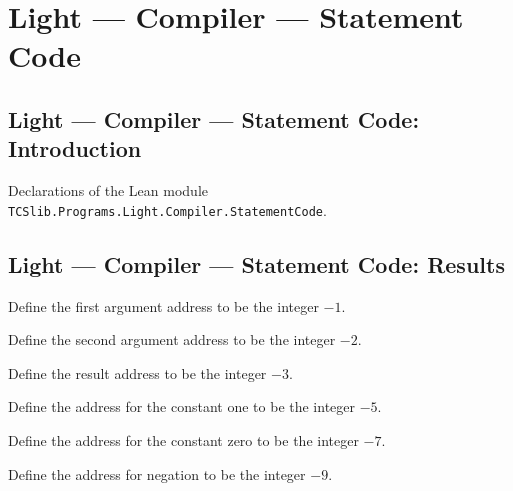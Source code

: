 \section{Light --- Compiler --- Statement Code}
\subsection*{Light --- Compiler --- Statement Code: Introduction}

Declarations of the Lean module \texttt{TCSlib.Programs.Light.Compiler.StatementCode}.

\subsection*{Light --- Compiler --- Statement Code: Results}

\begin{definition}
\label{Light.Compiler.cARG1}
\leanok
Define the first argument address to be the integer $-1$.
\end{definition}

\begin{definition}
\label{Light.Compiler.cARG2}
\leanok
Define the second argument address to be the integer $-2$.
\end{definition}

\begin{definition}
\label{Light.Compiler.cRESULT}
\leanok
Define the result address to be the integer $-3$.
\end{definition}

\begin{definition}
\label{Light.Compiler.cONE}
\leanok
Define the address for the constant one to be the integer $-5$.
\end{definition}

\begin{definition}
\label{Light.Compiler.cZERO}
\leanok
Define the address for the constant zero to be the integer $-7$.
\end{definition}

\begin{definition}
\label{Light.Compiler.cNEG}
\leanok
Define the address for negation to be the integer $-9$.
\end{definition}

